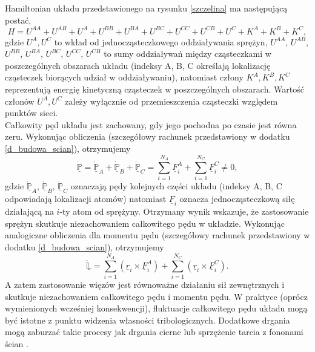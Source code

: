 \documentclass[12pt,a4paper,openright]{report} %
\begin{document}
Hamiltonian układu przedstawionego na rysunku \ref{szczelina} ma następującą postać,
\begin{equation}
H=U^{AA}+U^{AB}+U^{A}+U^{BB}+U^{BA}+U^{BC}+U^{CC}+U^{CB}+U^{C}+K^{A}+K^{B}+K^{C},
\end{equation}
gdzie $U^A, U^C$ to wkład od jednocząsteczkowego oddziaływania sprężyn, $U^{AA}$, $U^{AB}$, $U^{BB}$, $U^{BA}$, $U^{BC}$, $U^{CC}$, $U^{CB}$ to sumy oddziaływań między cząsteczkami w poszczególnych obszarach układu (indeksy A, B, C określają lokalizację cząsteczek biorących udział w oddziaływaniu), natomiast człony $K^{A}, K^{B}, K^{C}$ reprezentują energię kinetyczną cząsteczek w poszczególnych obszarach. Wartość członów $U^A, U^C$ zależy wyłącznie od przemieszczenia cząsteczki względem punktów sieci. \\
Całkowity pęd układu jest zachowany, gdy jego pochodna po czasie jest równa zeru. Wykonując obliczenia (szczegółowy rachunek przedstawiony w dodatku \ref{d_budowa_scian}), otrzymujemy
\begin{equation}
\underline{\mathbb{\dot{P}}}=\underline{\mathbb{\dot{P}}}_A+\underline{\mathbb{\dot{P}}}_B+\underline{\mathbb{\dot{P}}}_C=\sum_{i=1}^{N_A}\underline{F}_{i}^{A}+\sum_{i=1}^{N_C}\underline{F}_{i}^{C} \neq 0,
\label{P_spr}
\end{equation}
gdzie $\underline{\mathbb{\dot{P}}}_A$, $\underline{\mathbb{\dot{P}}}_B$, $\underline{\mathbb{\dot{P}}}_C$ oznaczają pędy kolejnych części układu (indeksy A, B, C odpowiadają lokalizacji atomów) natomiast $\underline{F}_i$ oznacza jednocząsteczkową siłę działającą na $i$-ty atom od sprężyny. Otrzymany wynik wskazuje, że zastosowanie sprężyn skutkuje niezachowaniem całkowitego pędu w układzie. Wykonując analogiczne obliczenia dla momentu pędu (szczegółowy rachunek przedstawiony w dodatku \ref{d_budowa_scian}), otrzymujemy 
\begin{equation}
\underline{\dot{\mathbb{L}}}=\sum_{i=1}^{N_A} \left(
\underline{r}_i \times \underline{F}_i^A \right) +
\sum_{i=1}^{N_C} \left( \underline{r}_i \times \underline{F}_i^C
\right).
\label{L_spr}
\end{equation}
A zatem zastosowanie więzów jest równoważne działaniu sił zewnętrznych i skutkuje niezachowaniem całkowitego pędu i momentu pędu. W praktyce (oprócz wymienionych wcześniej konsekwencji), fluktuacje całkowitego pędu układu mogą być istotne z punktu widzenia własności tribologicznych. Dodatkowe drgania mogą zaburzać takie procesy jak drgania cierne lub sprzężenie tarcia z fononami ścian \cite{Krim2002, Thompson}.\\
\end{document}
